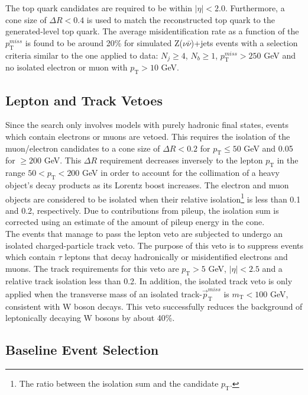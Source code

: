 The top quark candidates are required to be within $|\eta| < 2.0$. Furthermore, a cone size of $\Delta R < 0.4$ is used to match the reconstructed top quark to the generated-level top quark. The average misidentification rate as a function of the $p_\text{T}^{miss}$ is found to be around 20\% for simulated Z($\nu\bar{\nu}$)+jets events with a selection criteria similar to the one applied to data: $N_j \geq 4$, $N_b \geq 1$, $p_\text{T}^{miss} > 250$ GeV and no isolated electron or muon with $p_\text{T} > 10$ GeV.


\subsection{Lepton and Track Vetoes}\label{lepVeto}

Since the search only involves models with purely hadronic final states, events which contain electrons or muons are vetoed. This requires the isolation of the muon/electron candidates to a cone size of $\Delta R < 0.2$ for $p_\text{T} \leq 50$ GeV and 0.05 for $\geq 200$ GeV. This $\Delta R$ requirement decreases inversely to the lepton $p_\text{T}$ in the range $50 < p_\text{T} < 200$ GeV in order to account for the collimation of a heavy object's decay products as its Lorentz boost increases. The electron and muon objects are considered to be isolated when their relative isolation\footnote{The ratio between the isolation sum and the candidate $p_\text{T}$.} is less than 0.1 and 0.2, respectively. Due to contributions from pileup, the isolation sum is corrected using an estimate of the amount of pileup energy in the cone.\\

The events that manage to pass the lepton veto are subjected to undergo an isolated charged-particle track veto. The purpose of this veto is to suppress events which contain $\tau$ leptons that decay hadronically or misidentified electrons and muons. The track requirements for this veto are $p_\text{T} > 5$ GeV, $|\eta| < 2.5$ and a relative track isolation less than 0.2. In addition, the isolated track veto is only applied when the transverse mass of an isolated track-$\vec{p}_\text{T}^{miss}$ is $m_\text{T} < 100$ GeV, consistent with W boson decays. This veto successfully reduces the background of leptonically decaying W bosons by about 40\%.

\subsection{Baseline Event Selection}\label{baseline}

